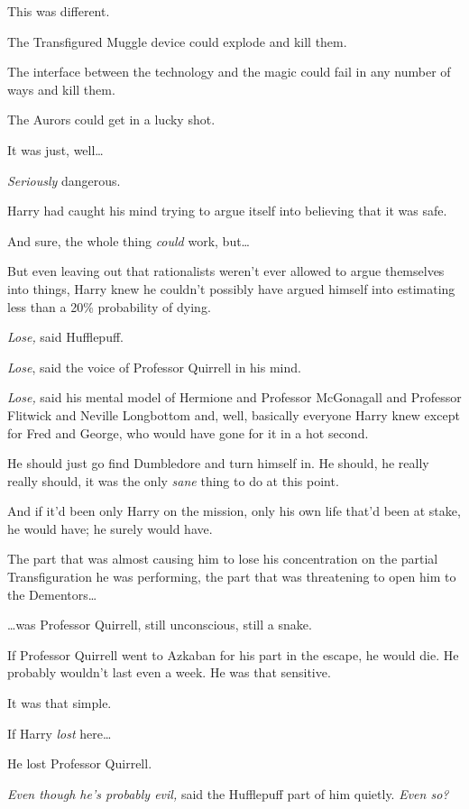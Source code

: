 This was different.

The Transfigured Muggle device could explode and kill them.

The interface between the technology and the magic could fail in any
number of ways and kill them.

The Aurors could get in a lucky shot.

It was just, well\ldots{}

\emph{Seriously} dangerous.

Harry had caught his mind trying to argue itself into believing that it
was safe.

And sure, the whole thing \emph{could} work, but\ldots{}

But even leaving out that rationalists weren't ever allowed to argue
themselves into things, Harry knew he couldn't possibly have argued
himself into estimating less than a 20\% probability of dying.

\emph{Lose,} said Hufflepuff.

\emph{Lose}, said the voice of Professor Quirrell in his mind.

\emph{Lose,} said his mental model of Hermione and Professor McGonagall
and Professor Flitwick and Neville Longbottom and, well, basically
everyone Harry knew except for Fred and George, who would have gone for
it in a hot second.

He should just go find Dumbledore and turn himself in. He should, he
really really should, it was the only \emph{sane} thing to do at this
point.

And if it'd been only Harry on the mission, only his own life that'd
been at stake, he would have; he surely would have.

The part that was almost causing him to lose his concentration on the
partial Transfiguration he was performing, the part that was threatening
to open him to the Dementors\ldots{}

\ldots{}was Professor Quirrell, still unconscious, still a snake.

If Professor Quirrell went to Azkaban for his part in the escape, he
would die. He probably wouldn't last even a week. He was that sensitive.

It was that simple.

If Harry \emph{lost} here\ldots{}

He lost Professor Quirrell.

\emph{Even though he's probably evil,} said the Hufflepuff part of him
quietly. \emph{Even so?}

